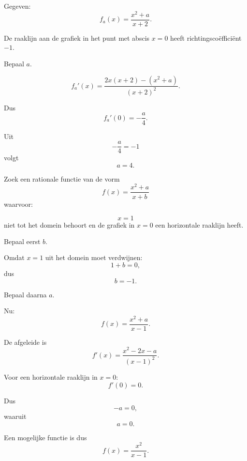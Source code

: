 \documentclass{ximera}
\begin{document}
\begin{oefening}{\oefG}

Gegeven:
\[
f_a(x)=\frac{x^2+a}{x+2}.
\]

De raaklijn aan de grafiek in het punt met abscis $x=0$
heeft richtingscoëfficiënt $-1$.

Bepaal $a$.

\begin{oplossing}
\[
f_a'(x)
=
\frac{
2x(x+2)-(x^2+a)
}{
(x+2)^2
}.
\]

Dus
\[
f_a'(0)
=
-\frac{a}{4}.
\]

Uit
\[
-\frac{a}{4}=-1
\]
volgt
\[
\boxed{a=4}.
\]
\end{oplossing}

\end{oefening}



\begin{oefening}{\oefG}

Zoek een rationale functie van de vorm
\[
f(x)=\frac{x^2+a}{x+b}
\]
waarvoor:

\[
x=1
\]
niet tot het domein behoort en de grafiek in $x=0$ een horizontale
raaklijn heeft.

\begin{question}
Bepaal eerst $b$.

\begin{oplossing}
Omdat $x=1$ uit het domein moet verdwijnen:
\[
1+b=0,
\]
dus
\[
b=-1.
\]
\end{oplossing}
\end{question}


\begin{question}
Bepaal daarna $a$.

\begin{oplossing}
Nu:
\[
f(x)=\frac{x^2+a}{x-1}.
\]

De afgeleide is
\[
f'(x)
=
\frac{x^2-2x-a}{(x-1)^2}.
\]

Voor een horizontale raaklijn in $x=0$:
\[
f'(0)=0.
\]

Dus
\[
-a=0,
\]
waaruit
\[
a=0.
\]

Een mogelijke functie is dus
\[
\boxed{
f(x)=\frac{x^2}{x-1}
}.
\]
\end{oplossing}
\end{question}

\end{oefening}
\end{document}
